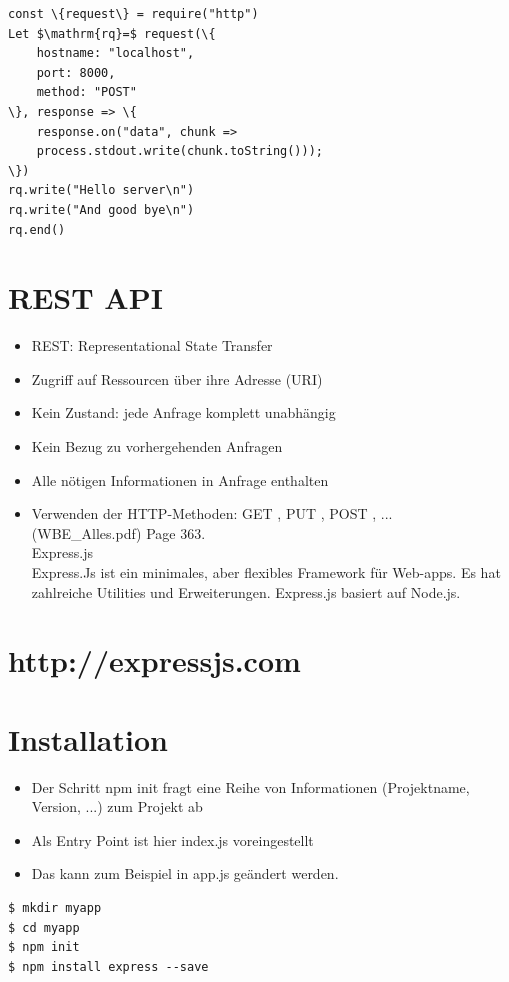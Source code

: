 \documentclass[10pt]{article}
\begin{document}
\begin{verbatim}
const \{request\} = require("http")
Let $\mathrm{rq}=$ request(\{
    hostname: "localhost",
    port: 8000,
    method: "POST"
\}, response => \{
    response.on("data", chunk =>
    process.stdout.write(chunk.toString()));
\})
rq.write("Hello server\n")
rq.write("And good bye\n")
rq.end()
\end{verbatim}

\section*{REST API}
\begin{itemize}
  \item REST: Representational State Transfer
  \item Zugriff auf Ressourcen über ihre Adresse (URI)
  \item Kein Zustand: jede Anfrage komplett unabhängig
  \item Kein Bezug zu vorhergehenden Anfragen
  \item Alle nötigen Informationen in Anfrage enthalten
  \item Verwenden der HTTP-Methoden: GET , PUT , POST , ...\\
(WBE\_Alles.pdf) Page 363.\\
Express.js\\
Express.Js ist ein minimales, aber flexibles Framework für Web-apps. Es hat zahlreiche Utilities und Erweiterungen. Express.js basiert auf Node.js.
\end{itemize}

\section*{http://expressjs.com}
\section*{Installation}
\begin{itemize}
  \item Der Schritt npm init fragt eine Reihe von Informationen (Projektname, Version, ...) zum Projekt ab
  \item Als Entry Point ist hier index.js voreingestellt
  \item Das kann zum Beispiel in app.js geändert werden.
\end{itemize}

\begin{verbatim}
$ mkdir myapp
$ cd myapp
$ npm init
$ npm install express --save
\end{verbatim}
\end{document}
